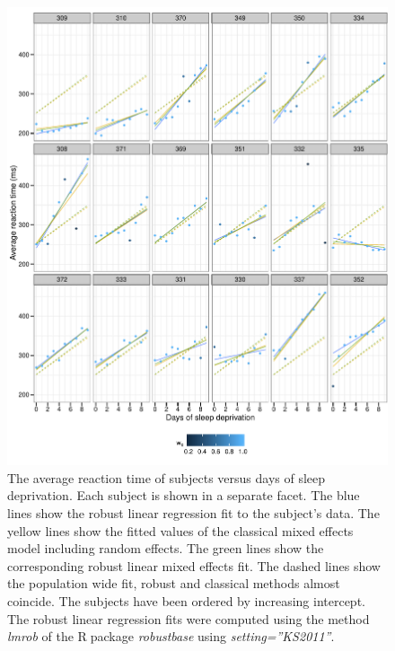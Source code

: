 \documentclass[11pt, a4paper]{article}
\newcommand*{\Rp}{\textsf{R}$\;$}
\theoremstyle{note}
\begin{document}
\begin{figure}[htpb]
  \centering
  \includegraphics{figs/fig-ex-sleepstudy-ex-comparsion}
  \caption{The average reaction time of subjects versus days of sleep
    deprivation. Each subject is shown in a separate facet. The blue lines
    show the robust linear regression fit to the subject's data. The yellow
    lines show the fitted values of the classical mixed effects model
    including random effects. The green lines show the corresponding robust
    linear mixed effects fit. The dashed lines show the population wide
    fit, robust and classical methods almost coincide. The subjects have
    been ordered by increasing intercept. The robust linear regression fits
    were computed using the method \emph{lmrob} of the \Rp package
    \emph{robustbase} \citep{robustbase} using \emph{setting=''KS2011''}. }
  \label{fig:sleepstudyExComparison}
\end{figure}
\end{document}
